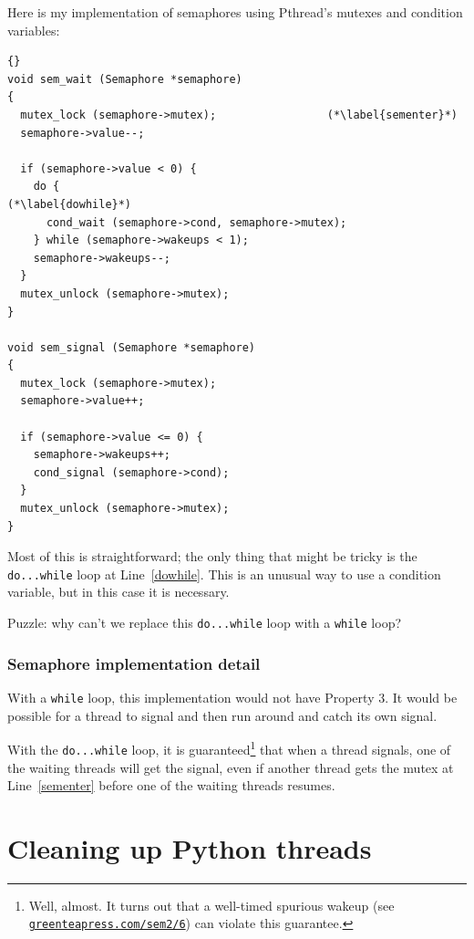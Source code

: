 \documentclass{book}
\newcommand{\shortlink}[1]{\href{https://greenteapress.com/sem2/#1}{\nolinkurl{greenteapress.com/sem2/#1}}}
\newcommand{\clearemptydoublepage}{\newpage\cleardoublepage}
\begin{document}
Here is my implementation of semaphores using Pthread's mutexes
and condition variables:

\begin{lstlisting}[title={}]{}
void sem_wait (Semaphore *semaphore)
{
  mutex_lock (semaphore->mutex);                 (*\label{sementer}*)
  semaphore->value--;

  if (semaphore->value < 0) {
    do {                                                (*\label{dowhile}*)
      cond_wait (semaphore->cond, semaphore->mutex);
    } while (semaphore->wakeups < 1);
    semaphore->wakeups--;
  }
  mutex_unlock (semaphore->mutex);
}

void sem_signal (Semaphore *semaphore)
{
  mutex_lock (semaphore->mutex);
  semaphore->value++;

  if (semaphore->value <= 0) {
    semaphore->wakeups++;
    cond_signal (semaphore->cond);
  }
  mutex_unlock (semaphore->mutex);
}
\end{lstlisting}

Most of this is straightforward; the only thing that might be 
tricky is the {\tt do...while} loop at Line~\ref{dowhile}.
This is an unusual way to use a condition variable, but in
this case it is necessary.

Puzzle: why can't we replace this {\tt do...while} loop
with a {\tt while} loop?

\clearemptydoublepage
\subsection{Semaphore implementation detail}

With a {\tt while} loop, this implementation would not have
Property 3.  It would be possible for a thread to signal
and then run around and catch its own signal.

With the {\tt do...while} loop, it is guaranteed\footnote{Well,
  almost.  It turns out that a well-timed spurious wakeup (see
  \shortlink{6}) can violate this
  guarantee.} that when a thread signals, one of the waiting threads
will get the signal, even if another thread gets the mutex at
Line~\ref{sementer} before one of the waiting threads resumes.





\appendix

\chapter{Cleaning up Python threads}
\label{cleanup}
\end{document}
